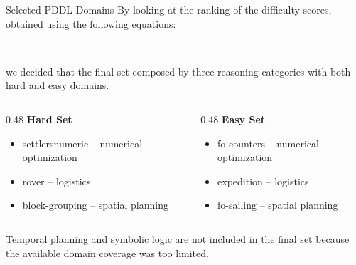 \documentclass{beamer}
\begin{document}
\begin{frame}{Selected PDDL Domains}\footnotesize
    By looking at the ranking of the difficulty scores, obtained using the following equations:
    \footnotesize

    \vspace{0.2cm}
      \\
    \vspace{0.2cm}

    we decided that the final set composed by three reasoning categories with both hard and easy domains.

    \vspace{0.25cm}
    \begin{columns}[T]
        \begin{column}{0.48\textwidth}
            \centering
            \textbf{Hard Set}
            \begin{itemize}
                \item settlersnumeric -- numerical optimization
                \item rover -- logistics
                \item block-grouping -- spatial planning
            \end{itemize}
        \end{column}
        \begin{column}{0.48\textwidth}
            \centering
            \textbf{Easy Set}
            \begin{itemize}
                \item fo-counters -- numerical optimization
                \item expedition -- logistics
                \item fo-sailing -- spatial planning
            \end{itemize}
        \end{column}
    \end{columns}

    \vspace{0.3cm}
    Temporal planning and symbolic logic are not included in the final set because the available domain coverage was too limited.
\end{frame}
\end{document}
